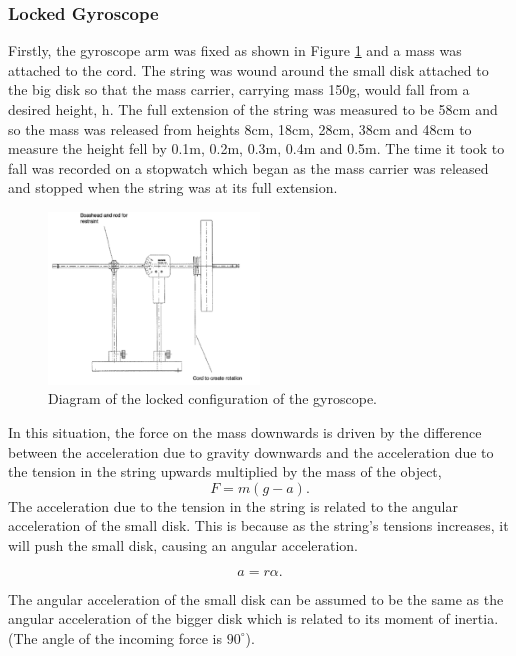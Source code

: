 \documentclass{article}
\begin{document}
\subsubsection{Locked Gyroscope}
Firstly, the gyroscope arm was fixed as shown in Figure \ref{fig:locked} and a mass was 
attached to the cord. The string was wound around the small disk attached to the big disk 
so that the mass carrier, carrying mass 150g, would fall from a desired height, h. The full 
extension of the string was measured to be 58cm and so the mass was released from heights 
8cm, 18cm, 28cm, 38cm and 48cm to measure the height fell by 0.1m, 0.2m, 0.3m, 0.4m and 
0.5m. The time it took to  fall was recorded on a stopwatch which began as the mass carrier 
was released and stopped when the string was at its full extension.
\begin{figure}[H]
    \centering
    \includegraphics[width=0.5\textwidth]{figure1.png}
    \caption{Diagram of the locked configuration of the gyroscope.}
    \label{fig:locked}
\end{figure}
In this situation, the force on the mass downwards is driven by the difference
between the acceleration due to gravity downwards and the acceleration due to the tension
in the string upwards multiplied by the mass of the object,
\begin{equation}
     F = m(g-a).
\end{equation}
The acceleration due to the tension in the string is related to the angular 
acceleration of the small disk. This is because as the string's 
tensions increases, it will push the small disk, causing an 
angular acceleration.

\begin{equation}
    a = r\alpha.
\end{equation}

The angular acceleration of the small disk can be assumed to be the same as 
the angular acceleration of the bigger disk which is related to its moment 
of inertia. (The angle of the incoming force is $90^{\circ}$).
\end{document}
